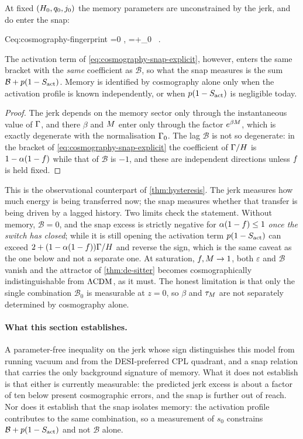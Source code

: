 \begin{theorem}
  \label{thm:memory-fingerprint}
  At fixed $(H_{0},q_0,j_0)$ the memory parameters are unconstrained by the
  jerk, and do enter the snap:
  \begin{keyresult}{C}{eq:cosmography-fingerprint}
    =0 ,
    \qquad
    =+\varepsilon_0\  .
  \end{keyresult}
  The activation term of \cref{eq:cosmography-snap-explicit}, however, enters
  the same bracket with the \emph{same} coefficient as $\mathcal B$, so what
  the snap measures is the sum $\mathcal B+p(1-S_{\mathrm{act}})$. Memory is identified by
  cosmography alone only when the activation profile is known independently, or
  when $p(1-S_{\mathrm{act}})$ is negligible today.
\end{theorem}

\begin{proof}
  The jerk depends on the memory sector only through the instantaneous value of
  $\Gamma$, and there $\beta$ and $M$ enter only through the factor
  $e^{\beta M}$, which is exactly degenerate with the normalisation
  $\Gamma_{0}$. The lag $\mathcal B$ is not so degenerate: in the bracket of
  \cref{eq:cosmography-snap-explicit} the coefficient of $\Gamma/H$ is
  $1-\alpha(1-f)$ while that of $\mathcal B$ is $-1$, and these are
  independent directions unless $f$ is held fixed.
\end{proof}

This is the observational counterpart of \cref{thm:hysteresis}. The jerk
measures how much energy is being transferred now; the snap measures whether
that transfer is being driven by a lagged history. Two limits check the
statement. Without memory, $\mathcal B=0$, and the snap excess is strictly
negative for $\alpha(1-f)\le1$ \emph{once the switch has closed}; while it
is still opening the activation term $p(1-S_{\mathrm{act}})$ can exceed
$2+(1-\alpha(1-f))\Gamma/H$ and reverse the sign, which is the same
caveat as the one below and not a separate one. At saturation, $f,M\to1$, both
$\varepsilon$ and $\mathcal B$ vanish and the \dS attractor of
\cref{thm:de-sitter} becomes cosmographically indistinguishable from $\Lambda\mathrm{CDM}$,
as it must. The honest limitation is that only the single combination
$\mathcal B_0$ is measurable at $z=0$, so $\beta$ and $\tau_{M}$ are not separately
determined by cosmography alone.

\paragraph{What this section establishes.}
A parameter-free inequality on the jerk whose sign distinguishes this model
from running vacuum and from the DESI-preferred CPL quadrant, and a snap
relation that carries the only background signature of memory. What it does not
establish is that either is currently measurable: the predicted jerk excess is
about a factor of ten below present cosmographic errors, and the snap is
further out of reach. Nor does it establish that the snap isolates memory: the
activation profile contributes to the same combination, so a measurement of
$s_0$ constrains $\mathcal B+p(1-S_{\mathrm{act}})$ and not $\mathcal B$ alone.
